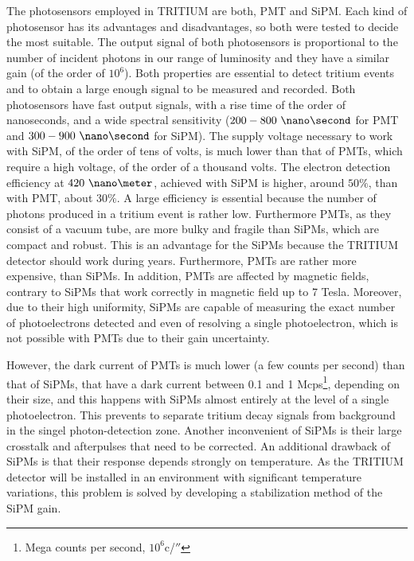 The photosensors employed in TRITIUM are both, PMT and SiPM. Each kind of photosensor has its advantages and disadvantages, so both were tested to decide the most suitable. The output signal of both photosensors is proportional to the number of incident photons in our range of luminosity and they have a similar gain (of the order of $10^6$). Both properties are essential to detect tritium events and to obtain a large enough signal to be measured and recorded. Both photosensors have fast output signals, with a rise time of the order of nanoseconds, and a wide spectral sensitivity ($200-800~\nano\second$ for PMT and $300-900~\nano\second$ for SiPM). The supply voltage necessary to work with SiPM, of the order of tens of volts, is much lower than that of PMTs, which require a high voltage, of the order of a thousand volts. The electron detection efficiency at $420~\nano\meter$,  achieved with SiPM is higher, around $50\%$, than with PMT, about $30\%$. A large efficiency is essential because the number of photons produced in a tritium event is rather low. Furthermore PMTs, as they consist of a vacuum tube, are more bulky and fragile than SiPMs, which are compact and robust. This is an advantage for the SiPMs because the TRITIUM detector should work during years. Furthermore, PMTs are rather more expensive, than SiPMs. In addition, PMTs are affected by magnetic fields, contrary to SiPMs that work correctly in magnetic field up to 7 Tesla. Moreover, due to their high uniformity, SiPMs are capable of measuring the exact number of photoelectrons detected and even of resolving a single photoelectron, which is not possible with PMTs due to their gain uncertainty.

However, the dark current of PMTs is much lower (a few counts per second) than that of SiPMs, that have a dark current between 0.1 and 1 Mcps\footnote{Mega counts per second, $10^6$c/$\second$}, depending on their size, and this happens with SiPMs almost entirely at the level of a single photoelectron. This prevents to separate tritium decay signals from background in the singel photon-detection zone. Another inconvenient of SiPMs is their large crosstalk and afterpulses that need to be corrected. An additional drawback of SiPMs is that their response depends strongly on temperature. As the TRITIUM detector will be installed in an environment with significant temperature variations, this problem is solved by developing a stabilization method of the SiPM gain.